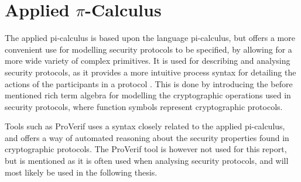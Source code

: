 \section{Applied $\pi$-Calculus}

The applied pi-calculus is based upon the language pi-calculus, but offers a more convenient use for modelling security protocols to be specified, by allowing for a more wide variety of complex primitives. It is used for describing and analysing security protocols, as it provides a more intuitive process syntax for detailing the actions of the participants in a protocol \autocite{AplliedPiCalsulus2010}. This is done by introducing the before mentioned rich term algebra for modelling the cryptographic operations used in security protocols, where function symbols represent cryptographic protocols. 

Tools such as ProVerif \autocite{ProVerif} uses a syntax closely related to the applied pi-calculus, and offers a way of automated reasoning about the security properties found in cryptographic protocols. The ProVerif tool is however not used for this report, but is mentioned as it is often used when analysing security protocols, and will most likely be used in the following thesis.\\

